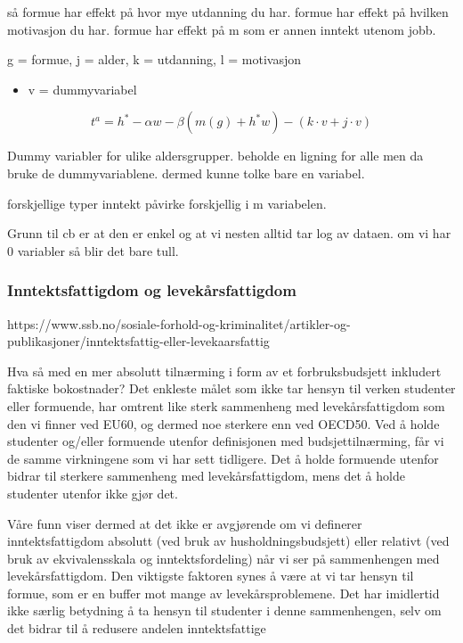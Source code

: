 \documentclass[
  11pt,
  a4paper,
  DIV=11,
  numbers=noendperiod]{scrartcl}
\providecommand{\tightlist}{%
  \setlength{\itemsep}{0pt}\setlength{\parskip}{0pt}}\usepackage{longtable,booktabs,array}
\begin{document}
så formue har effekt på hvor mye utdanning du har. formue har effekt på
hvilken motivasjon du har. formue har effekt på m som er annen inntekt
utenom jobb.

g = formue, j = alder, k = utdanning, l = motivasjon

\begin{itemize}
\tightlist
\item
  v = dummyvariabel
\end{itemize}

\[
t^a = h^* - \alpha w - \beta(m(g) + h^*w) - (k\cdot v+j\cdot v)
\]

Dummy variabler for ulike aldersgrupper. beholde en ligning for alle men
da bruke de dummyvariablene. dermed kunne tolke bare en variabel.

forskjellige typer inntekt påvirke forskjellig i m variabelen.

Grunn til cb er at den er enkel og at vi nesten alltid tar log av
dataen. om vi har 0 variabler så blir det bare tull.

\subsubsection{Inntektsfattigdom og
levekårsfattigdom}\label{inntektsfattigdom-og-levekuxe5rsfattigdom}

https://www.ssb.no/sosiale-forhold-og-kriminalitet/artikler-og-publikasjoner/inntektsfattig-eller-levekaarsfattig

Hva så med en mer absolutt tilnærming i form av et forbruksbudsjett
inkludert faktiske bokostnader? Det enkleste målet som ikke tar hensyn
til verken studenter eller formuende, har omtrent like sterk sammenheng
med levekårsfattigdom som den vi finner ved EU60, og dermed noe sterkere
enn ved OECD50. Ved å holde studenter og/eller formuende utenfor
definisjonen med budsjettilnærming, får vi de samme virkningene som vi
har sett tidligere. Det å holde formuende utenfor bidrar til sterkere
sammenheng med levekårsfattigdom, mens det å holde studenter utenfor
ikke gjør det.

Våre funn viser dermed at det ikke er avgjørende om vi definerer
inntektsfattigdom absolutt (ved bruk av husholdningsbudsjett) eller
relativt (ved bruk av ekvivalensskala og inntektsfordeling) når vi ser
på sammenhengen med levekårsfattigdom. Den viktigste faktoren synes å
være at vi tar hensyn til formue, som er en buffer mot mange av
levekårsproblemene. Det har imidlertid ikke særlig betydning å ta hensyn
til studenter i denne sammenhengen, selv om det bidrar til å redusere
andelen inntektsfattige
\end{document}
